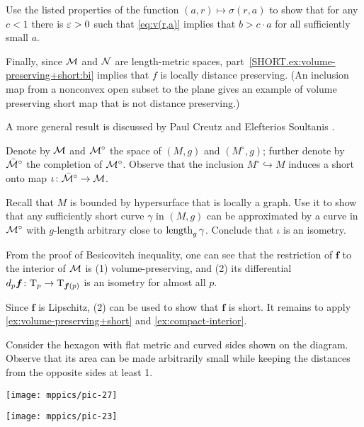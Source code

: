 Use the listed properties of the function $(a,r)\mapsto \sigma(r,a)$ to show that for any $c<1$ there is $\varepsilon>0$ such that \ref{eq:v(r,a)} implies that $b>c\cdot a$ for all sufficiently small $a$.

Finally, since $\mathcal{M}$ and  $\mathcal{N}$ are length-metric spaces, part~\ref{SHORT.ex:volume-preserving+short:bi} implies that $f$ is locally distance preserving.
(An inclusion map from a nonconvex open subset to the plane gives an example of volume preserving short map that is not distance preserving.)


\medskip

A more general result is discussed by Paul Creutz and Elefterios Soultanis \cite{creutz-soultanis}.


 Denote by $\mathcal{M}$ and $\mathcal{M}^\circ$ the space of $(M,g)$ and $(M^\circ,g)$;
further denote by $\bar{\mathcal{M}}^\circ$ the completion of $\mathcal{M}^\circ$.
Observe that the inclusion $M^\circ\hookrightarrow M$ induces a short onto map $\iota\:\bar{\spc{M}}^\circ\z\to\spc{M}$.

Recall that $M$ is bounded by hypersurface that is locally a graph.
Use it to show that any sufficiently short curve $\gamma$ in $(M,g)$ can be approximated by a curve in $\mathcal{M}^\circ$ with $g$-length arbitrary close to $\mathop{\rm length}\nolimits_g\gamma$.
Conclude that $\iota$ is an isometry.


From the proof of Besicovitch inequality, one can see that the restriction of $\bm{f}$ to the interior of $\mathcal{M}$ is
(1) volume-preserving, and 
(2) its differential $d_p\bm{f}\colon\mathrm{T}_p\to \mathrm{T}_{\bm{f}(p)}$ is an isometry for almost all $p$.

Since $\bm{f}$ is Lipschitz, (2) can be used to show that $\bm{f}$ is short.
It remains to apply \ref{ex:volume-preserving+short} and \ref{ex:compact-interior}.

Consider the hexagon with flat metric and curved sides shown on the diagram.
Observe that its area can be made arbitrarily small while keeping the distances from the opposite sides at least 1.

\begin{Figure}
\begin{minipage}{.48\textwidth}
\centering
\texttt{[image: mppics/pic-27]}
\end{minipage}\hfill
\begin{minipage}{.48\textwidth}
\centering
\texttt{[image: mppics/pic-23]}
\end{minipage}
\vskip-4mm
\end{Figure}

